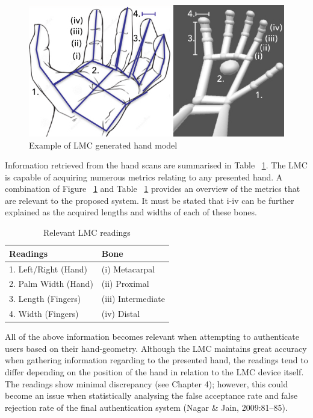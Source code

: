 
  
\begin{figure}[htbp!] 
\centering    
\includegraphics[width=1.0\textwidth]{Chapter2/Figs/Example_of_LMC_generated_hand_model.jpeg}
\caption[Example of LMC generated hand model]{Example of LMC generated hand model}
\label{fig:Example_of_LMC_generated_hand_model}
\end{figure}


Information retrieved from the hand scans are summarised in Table ~\ref{table: Relevant LMC readings}. The LMC is capable of acquiring numerous metrics relating to any presented hand. A combination of Figure ~\ref{fig:Example_of_LMC_generated_hand_model} and Table ~\ref{table: Relevant LMC readings} provides an overview of the metrics that are relevant to the proposed system. It must be stated that i-iv can be further explained as the acquired lengths and widths of each of these bones.

\begin{table}[h!]
\caption{Relevant LMC readings}
\centering
 \begin{tabular}{|p{} | p{}|} 
 \hline
	\textbf{Readings} & \textbf{Bone} \\ [1ex] 
 \hline\hline 
 1.	Left/Right (Hand) & (i) Metacarpal \\[1ex]
 \hline 
 2.	Palm Width (Hand) & (ii) Proximal \\[1ex]
 \hline
 3.	Length (Fingers) & (iii) Intermediate \\ [1ex] 
 \hline
 4.	Width (Fingers) & (iv) Distal \\ [1ex] 
 \hline
 \end{tabular}
 \label{table: Relevant LMC readings}
\end{table}


All of the above information becomes relevant when attempting to authenticate users based on their hand-geometry. Although the LMC maintains great accuracy when gathering information regarding to the presented hand, the readings tend to differ depending on the position of the hand in relation to the LMC device itself. The readings show minimal discrepancy (see Chapter 4); however, this could become an issue when statistically analysing the false acceptance rate and false rejection rate of the final authentication system (Nagar \& Jain, 2009:81–85).

